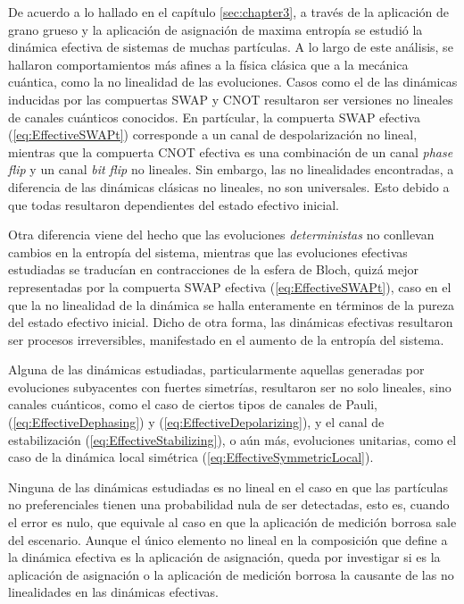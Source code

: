 De acuerdo a lo hallado en el capítulo \ref{sec:chapter3}, a través de la aplicación de grano grueso y la aplicación de asignación de maxima entropía se estudió la dinámica efectiva de sistemas de muchas partículas. A lo largo de este análisis, se hallaron comportamientos más afines a la física clásica que a la mecánica cuántica, como la no linealidad de las evoluciones.  Casos como el de las dinámicas inducidas por las compuertas SWAP y CNOT resultaron ser versiones no lineales de canales cuánticos conocidos. En partícular, la compuerta SWAP efectiva (\ref{eq:EffectiveSWAPt}) corresponde a un canal de despolarización no lineal, mientras que la compuerta CNOT efectiva es una combinación de un canal \textit{phase flip} y un canal \textit{bit flip} no lineales. \acnote{|} Sin embargo, las no linealidades encontradas, a diferencia de las dinámicas clásicas no lineales, no son universales. Esto debido a que todas resultaron dependientes del estado efectivo inicial. 
%

Otra diferencia viene del hecho que las evoluciones \textit{deterministas} \acnote{\checkmark} no conllevan cambios en la entropía del sistema, mientras que las evoluciones efectivas estudiadas se traducían en contracciones de la esfera de Bloch, quizá mejor representadas por la compuerta SWAP efectiva (\ref{eq:EffectiveSWAPt}), caso en el que la no linealidad de la dinámica se halla enteramente en términos de la pureza del estado efectivo inicial. Dicho de otra forma, las dinámicas efectivas resultaron ser procesos irreversibles, manifestado en el aumento de la entropía del sistema. \acnote{\checkmark}

Alguna de las dinámicas estudiadas, particularmente aquellas generadas por evoluciones subyacentes con fuertes simetrías, resultaron ser no solo lineales, sino canales cuánticos, como el caso de ciertos tipos de canales de Pauli, (\ref{eq:EffectiveDephasing}) y (\ref{eq:EffectiveDepolarizing}), y el canal de estabilización (\ref{eq:EffectiveStabilizing}), o aún más, evoluciones unitarias, como el caso de la dinámica local simétrica (\ref{eq:EffectiveSymmetricLocal}). 

Ninguna de las dinámicas estudiadas es no lineal en el caso en que las partículas no preferenciales tienen una probabilidad nula de ser detectadas, esto es, cuando el error es nulo, que equivale al caso en que la aplicación de medición borrosa sale del escenario. Aunque el único elemento no lineal en la composición que define a la dinámica efectiva es la aplicación de asignación, queda por investigar si es la aplicación de asignación o la aplicación de medición borrosa la causante de las no linealidades en las dinámicas efectivas.


